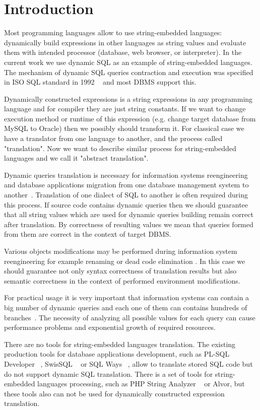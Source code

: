 \documentclass{llncs}
\begin{document}
\section{Introduction}

Most programming languages allow to use string-embedded languages: dynamically build expressions in other languages as string values and evaluate them with intended processor (database, web browser, or interpreter). In the current work we use dynamic SQL as an example of string-embedded languages. The mechanism of dynamic SQL queries contraction and execution was specified in ISO SQL standard in 1992 ~\cite{ISO} and most DBMS support this. 

Dynamically constructed expressions is a string expressions in any programming language and for compiler they are just string constants. If we want to change execution method or runtime of this expression (e.g. change target database from MySQL to Oracle) then we possibly should transform it. For classical case we have a translator from one language to another, and the process called "translation". Now we want to describe similar process for string-embedded languages and we call it "abstract translation".

Dynamic queries translation is necessary for information systems reengineering and database applications migration from one database management system to another~\cite{NetDbTransform}. Translation of one dialect of SQL to another is often required during this process. If source code contains dynamic queries then we should guarantee that all string values which are used for dynamic queries building remain correct after translation. By correctness of resulting values we mean that queries formed from them are correct in the context of target DBMS.
 
Various objects modifications may be performed during information system reengineering for example renaming or dead code elimination . In this case we should guarantee not only syntax correctness of translation results but also semantic correctness in the context of performed environment modifications. 

For practical usage it is very important that information systems can contain a big number of dynamic queries and each one of them can contains hundreds of branches~\cite{TiunovaUIInt}. The necessity of analyzing all possible values for each query can cause  performance problems and exponential growth of required resources.

There are no tools for string-embedded languages translation. The existing production tools for database applications development, such as PL-SQL Developer ~\cite{PLSQL}, SwisSQL ~\cite{SwissSQL} or SQL Ways ~\cite{SQLWays}, allow to translate stored SQL code but do not support dynamic SQL translation. There is a set of tools for string-embedded languages processing, such as PHP String Analyzer ~\cite{PHPSA} or Alvor, but these tools also can not be used for dynamically constructed expression translation.
\end{document}
